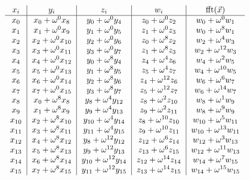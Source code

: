 \documentclass[12 pt]{amsart}
\newcommand\T{\rule{0pt}{-1.0ex}}       %
\newcommand\B{\rule[0.5ex]{0pt}{0pt}} %
\newcommand{\om}[2] {\omega_{#1}^{#2}}
\begin{document}
\begin{equation}
\label{fft_fma}
\begin{tabular}{c|c|c|c|c}
$x_i$ & $y_i$ & $z_i$ & $w_i$ & $\operatorname{fft}(\vec{x})$\\
\hline
 $x_{0}$ &  $x_{0}+\om{}{0}x_{8}$  & $y_{0}+\om{}{0}y_{4}$    & $z_{0}+\om{}{0}z_{2}$    & $w_{0}+\om{}{0}w_{1}$\T\B\\
 $x_{1}$ &  $x_{1}+\om{}{0}x_{9}$  & $y_{1}+\om{}{0}y_{5}$    & $z_{1}+\om{}{0}z_{3}$    & $w_{0}+\om{}{8}w_{1}$\T\B\\
 $x_{2}$ &  $x_{2}+\om{}{0}x_{10}$ & $y_{2}+\om{}{0}y_{6}$    & $z_{0}+\om{}{8}z_{2}$    & $w_{2}+\om{}{4}w_{3}$\T\B\\
 $x_{3}$ &  $x_{3}+\om{}{0}x_{11}$ & $y_{3}+\om{}{0}y_{7}$    & $z_{1}+\om{}{8}z_{3}$    & $w_{2}+\om{}{12}w_{3}$\T\B\\
 $x_{4}$ &  $x_{4}+\om{}{0}x_{12}$ & $y_{0}+\om{}{8}y_{4}$    & $z_{4}+\om{}{4}z_{6}$    & $w_{4}+\om{}{2}w_{5}$\T\B\\
 $x_{5}$ &  $x_{5}+\om{}{0}x_{13}$ & $y_{1}+\om{}{8}y_{5}$    & $z_{5}+\om{}{4}z_{7}$    & $w_{4}+\om{}{10}w_{5}$\T\B\\
 $x_{6}$ &  $x_{6}+\om{}{0}x_{14}$ & $y_{2}+\om{}{8}y_{6}$    & $z_{4}+\om{}{12}z_{6}$   & $w_{6}+\om{}{6}w_{7}$\T\B\\
 $x_{7}$ &  $x_{7}+\om{}{0}x_{15}$ & $y_{3}+\om{}{8}y_{7}$    & $z_{5}+\om{}{12}z_{7}$   & $w_{6}+\om{}{14}w_{7}$\T\B\\
 $x_{8}$ &  $x_{0}+\om{}{8}x_{8}$  & $y_{8}+\om{}{4}y_{12}$   & $z_{8}+\om{}{2}z_{10}$   & $w_{8}+\om{}{1}w_{9}$\T\B\\
 $x_{9}$ &  $x_{1}+\om{}{8}x_{9}$  & $y_{9}+\om{}{4}y_{13}$   & $z_{9}+\om{}{2}z_{11}$   & $w_{8}+\om{}{9}w_{9}$\T\B\\
$x_{10}$ &  $x_{2}+\om{}{8}x_{10}$ & $y_{10}+\om{}{4}y_{14}$  & $z_{8}+\om{}{10}z_{10}$  & $w_{10}+\om{}{5}w_{11}$\T\B\\
$x_{11}$ &  $x_{3}+\om{}{8}x_{11}$ & $y_{11}+\om{}{4}y_{15}$  & $z_{9}+\om{}{10}z_{11}$  & $w_{10}+\om{}{13}w_{11}$\T\B\\
$x_{12}$ &  $x_{4}+\om{}{8}x_{12}$ & $y_{8}+\om{}{12}y_{12}$  & $z_{12}+\om{}{6}z_{14}$  & $w_{12}+\om{}{3}w_{13}$\T\B\\
$x_{13}$ &  $x_{5}+\om{}{8}x_{13}$ & $y_{9}+\om{}{12}y_{13}$  & $z_{13}+\om{}{6}z_{15}$  & $w_{12}+\om{}{11}w_{13}$\T\B\\
$x_{14}$ &  $x_{6}+\om{}{8}x_{14}$ & $y_{10}+\om{}{12}y_{14}$ & $z_{12}+\om{}{14}z_{14}$ & $w_{14}+\om{}{7}w_{15}$\T\B\\
$x_{15}$ &  $x_{7}+\om{}{8}x_{15}$ & $y_{11}+\om{}{12}y_{15}$ & $z_{13}+\om{}{14}z_{15}$ & $w_{14}+\om{}{15}w_{15}$\T\B\\
\end{tabular} 
\end{equation}
\end{document}

